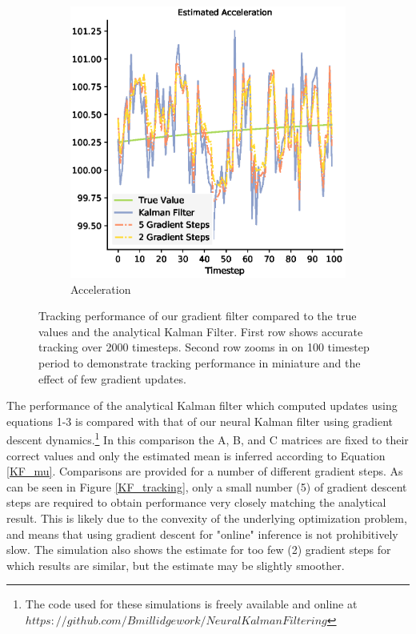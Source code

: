 \begin{figure}[H]
\begin{subfigure}{0.33\textwidth}
    \includegraphics[width=.8\linewidth]{chapter_3_figures/Estimated_Acceleration_NKF_zoomed.eps}
    \caption{Acceleration}
  \end{subfigure}
  \caption{Tracking performance of our gradient filter compared to the true values and the analytical Kalman Filter. First row shows accurate tracking over 2000 timesteps. Second row zooms in on 100 timestep period to demonstrate tracking performance in miniature and the effect of few gradient updates.}
\end{figure}


The performance of the analytical Kalman filter which computed updates using equations 1-3 is compared with that of our neural Kalman filter using gradient descent dynamics.\footnote{The code used for these simulations is freely available and online at $https://github.com/Bmillidgework/NeuralKalmanFiltering$} In this comparison the A, B, and C matrices are fixed to their correct values and only the estimated mean is inferred according to Equation \ref{KF_mu}. Comparisons are provided for a number of different gradient steps. As can be seen in Figure \ref{KF_tracking}, only a small number (5) of gradient descent steps are required to obtain performance very closely matching the analytical result. This is likely due to the convexity of the underlying optimization problem, and means that using gradient descent for "online" inference is not prohibitively slow. The simulation also shows the estimate for too few (2) gradient steps for which results are similar, but the estimate may be slightly smoother.

